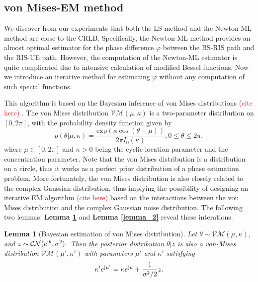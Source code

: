 \documentclass[12pt,draftclsnofoot,journal,onecolumn]{IEEEtran}
\newtheorem{lemma}{\bf Lemma}
\theoremstyle{nonumberplain}
\def \exp {\text{exp}}
\def \CN {\mathcal{CN}}
\def \VM {\mathcal{VM}}
\def \ch {\textcolor{red}{(cite here) }}
\begin{document}
\subsection{von Mises-EM method}    \label{von Mises-EM method}
    We discover from our experiments that both the LS method and the Newton-ML method are close to the CRLB. Specifically, the Newton-ML method provides an almost optimal estimator for the phase difference $\varphi$ between the BS-RIS path and the RIS-UE path. However, the computation of the Newton-ML estimator is quite complicated due to intensive calculation of modified Bessel functions. Now we introduce an iterative method for estimating $\varphi$ without any computation of such special functions.

    This algorithm is based on the Bayesian inference of von Mises distributions \ch. The von Mises distribution $\VM(\mu, \kappa)$ is a two-parameter distribution on $[0, 2\pi]$, with the probability density function given by 
    \begin{equation}
        p(\theta|\mu, \kappa) = \frac{\exp(\kappa \cos(\theta - \mu))}{2\pi I_0(\kappa)}, 0\leq \theta \leq 2\pi,
    \end{equation}
    where $\mu \in [0,2\pi]$ and $\kappa >0$ being the cyclic location parameter and the concentration parameter. Note that the von Mises distribution is a distribution on a circle, thus it works as a perfect prior distribution of a phase estimation problem. More fortunately, the von Mises distribution is also closely related to the complex Gaussian distribution, thus implying the possibility of designing an iterative EM algorithm \ch based on the interactions between the von Mises distribution and the complex Gaussian noise distribution. The following two lemmas: {\bf Lemma \ref{lemma_1}} and {\bf Lemma \ref{lemma_2}} reveal these interations. 
    \begin{lemma}[Bayesian estimation of von Mises distribution]\label{lemma_1}
        Let $\theta \sim \VM(\mu, \kappa)$, and $z \sim \CN(e^{{\rm j}\theta}, \sigma^2)$. Then the posterior distribution $\theta | z$ is also a von-Mises distribution $\VM(\mu', \kappa')$ with parameters $\mu'$ and $\kappa'$ satisfying
        \begin{equation}
            \kappa' e^{{\rm j}\mu'} = \kappa e^{{\rm j}\mu} + \frac{1}{\sigma^2/2}z.
        \end{equation}
    \end{lemma}
\end{document}
